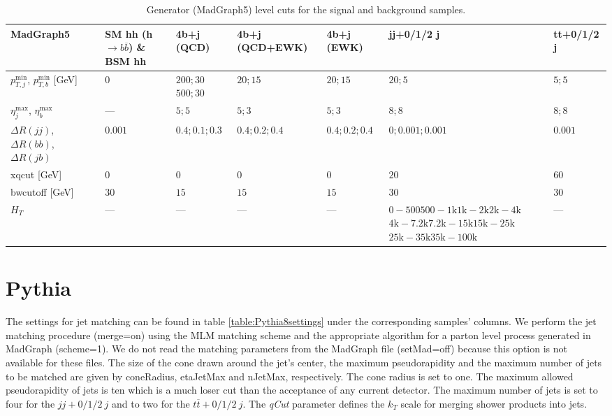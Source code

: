 \begin{table}[h]
	\centering
		\caption{Generator (MadGraph5) level cuts for the signal and background samples.}
		\label{table:MG5cuts}
	\begin{tabular}{lp{17mm}p{15mm}p{20mm}p{15mm}p{20mm}l}
		\toprule 
		\textbf{MadGraph5}& SM hh (h$\rightarrow b\overline{b}$) \& BSM hh& 4b+j (QCD) & 4b+j (QCD+EWK) & 4b+j (EWK) & jj+0/1/2 j & tt+0/1/2 j \\
		\midrule
		$p_{T,j}^{\text{min}}$, $p_{T,b}^{\text{min}}$ [GeV]& $0$ & $200;30$\newline $500;30$ & $20;15$ & $20;15$ & $20;5$ & $5;5$\\
		\rowcolor{black!7} $\eta_j^{\text{max}}$, $\eta_b^{\text{max}}$ & --- & $5;5$ & $5;3$ & $5;3$ & $8;8$ & $8;8$\\
		$\Delta R(jj)$, $\Delta R(bb)$, $\Delta R(jb)$& $0.001$ & $0.4;0.1;0.3$ & $0.4;0.2;0.4$ & $0.4;0.2;0.4$ & $0;0.001;0.001$ & $0.001$ \\
		\rowcolor{black!7} xqcut [GeV]& $0$ & $0$ & $0$ & $0$ & $20$ & $60$ \\
		bwcutoff [GeV]& $30$ & $15$ & $15$ & $15$ & $30$ & $30$\\
		\rowcolor{black!7} $H_T$ & --- & --- & --- & --- & $0-500$\newline $500-1\text{k}$\newline $1\text{k}-2\text{k}$\newline $2\text{k}-4\text{k}$\newline $4\text{k}-7.2\text{k}$\newline $7.2\text{k}-15\text{k}$\newline $15\text{k}-25\text{k}$\newline $25\text{k}-35\text{k}$\newline $35\text{k}-100\text{k}$ & ---\\
		\bottomrule
	\end{tabular}
\end{table}

\section{Pythia}
\label{sec:Pythia_par}

The settings for jet matching can be found in table \ref{table:Pythia8settings} under the corresponding samples' columns. We perform the jet matching procedure (merge=on) using the MLM matching scheme and the appropriate algorithm for a parton level process generated in MadGraph (scheme=1). We do not read the matching parameters from the MadGraph file (setMad=off) because this option is not available for these files. The size of the cone drawn around the jet's center, the maximum pseudorapidity and the maximum number of jets to be matched are given by coneRadius, etaJetMax and nJetMax, respectively. The cone radius is set to one. The maximum allowed pseudorapidity of jets is ten which is a much loser cut than the acceptance of any current detector. The maximum number of jets is set to four for the $jj+0/1/2 ~j$ and to two for the $t\overline{t}+0/1/2 ~j$. The \textit{qCut} parameter defines the $k_T$ scale for merging shower products into jets.

